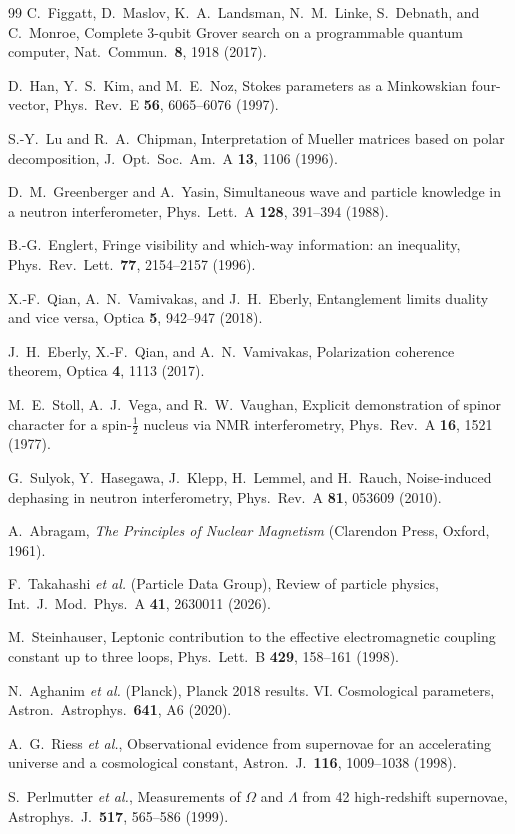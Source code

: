 \documentclass[aps,pra,onecolumn,superscriptaddress,nofootinbib,10pt]{revtex4-2}
\theoremstyle{definition}
\theoremstyle{remark}
\begin{document}
\begin{thebibliography}{99}
 C.~Figgatt, D.~Maslov, K.~A.~Landsman, N.~M.~Linke, S.~Debnath, and C.~Monroe, Complete 3-qubit Grover search on a programmable quantum computer, Nat.\ Commun.\ \textbf{8}, 1918 (2017).

 D.~Han, Y.~S.~Kim, and M.~E.~Noz, Stokes parameters as a Minkowskian four-vector, Phys.\ Rev.\ E \textbf{56}, 6065--6076 (1997).

 S.-Y.~Lu and R.~A.~Chipman, Interpretation of Mueller matrices based on polar decomposition, J.\ Opt.\ Soc.\ Am.\ A \textbf{13}, 1106 (1996).

 D.~M.~Greenberger and A.~Yasin, Simultaneous wave and particle knowledge in a neutron interferometer, Phys.\ Lett.\ A \textbf{128}, 391--394 (1988).

 B.-G.~Englert, Fringe visibility and which-way information: an inequality, Phys.\ Rev.\ Lett.\ \textbf{77}, 2154--2157 (1996).

 X.-F.~Qian, A.~N.~Vamivakas, and J.~H.~Eberly, Entanglement limits duality and vice versa, Optica \textbf{5}, 942--947 (2018).

 J.~H.~Eberly, X.-F.~Qian, and A.~N.~Vamivakas, Polarization coherence theorem, Optica \textbf{4}, 1113 (2017).

 M.~E.~Stoll, A.~J.~Vega, and R.~W.~Vaughan, Explicit demonstration of spinor character for a spin-$\tfrac12$ nucleus via NMR interferometry, Phys.\ Rev.\ A \textbf{16}, 1521 (1977).

 G.~Sulyok, Y.~Hasegawa, J.~Klepp, H.~Lemmel, and H.~Rauch, Noise-induced dephasing in neutron interferometry, Phys.\ Rev.\ A \textbf{81}, 053609 (2010).

 A.~Abragam, \emph{The Principles of Nuclear Magnetism} (Clarendon Press, Oxford, 1961).

 F.~Takahashi \emph{et al.} (Particle Data Group), Review of particle physics, Int.\ J.\ Mod.\ Phys.\ A \textbf{41}, 2630011 (2026).

 M.~Steinhauser, Leptonic contribution to the effective electromagnetic coupling constant up to three loops, Phys.\ Lett.\ B \textbf{429}, 158--161 (1998).

 N.~Aghanim \emph{et al.} (Planck), Planck 2018 results. VI. Cosmological parameters, Astron.\ Astrophys.\ \textbf{641}, A6 (2020).

 A.~G.~Riess \emph{et al.}, Observational evidence from supernovae for an accelerating universe and a cosmological constant, Astron.\ J.\ \textbf{116}, 1009--1038 (1998).

 S.~Perlmutter \emph{et al.}, Measurements of $\Omega$ and $\Lambda$ from 42 high-redshift supernovae, Astrophys.\ J.\ \textbf{517}, 565--586 (1999).

\end{thebibliography}
\end{document}
